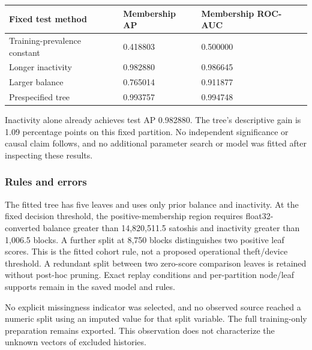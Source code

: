 \begin{longtable}[]{@{}lll@{}}
\toprule\noalign{}
Fixed test method & Membership AP & Membership ROC-AUC \\
\midrule\noalign{}
\endhead
\bottomrule\noalign{}
\endlastfoot
Training-prevalence constant & 0.418803 & 0.500000 \\
Longer inactivity & 0.982880 & 0.986645 \\
Larger balance & 0.765014 & 0.911877 \\
Prespecified tree & 0.993757 & 0.994748 \\
\end{longtable}

Inactivity alone already achieves test AP 0.982880. The tree's
descriptive gain is 1.09 percentage points on this fixed partition. No
independent significance or causal claim follows, and no additional
parameter search or model was fitted after inspecting these results.

\hypertarget{rules-and-errors}{%
\subsubsection{Rules and errors}\label{rules-and-errors}}

The fitted tree has five leaves and uses only prior balance and
inactivity. At the fixed decision threshold, the positive-membership
region requires float32-converted balance greater than 14,820,511.5
satoshis and inactivity greater than 1,006.5 blocks. A further split at
8,750 blocks distinguishes two positive leaf scores. This is the fitted
cohort rule, not a proposed operational theft/device threshold. A
redundant split between two zero-score comparison leaves is retained
without post-hoc pruning. Exact replay conditions and per-partition
node/leaf supports remain in the saved model and rules.

No explicit missingness indicator was selected, and no observed source
reached a numeric split using an imputed value for that split variable.
The full training-only preparation remains exported. This observation
does not characterize the unknown vectors of excluded histories.

